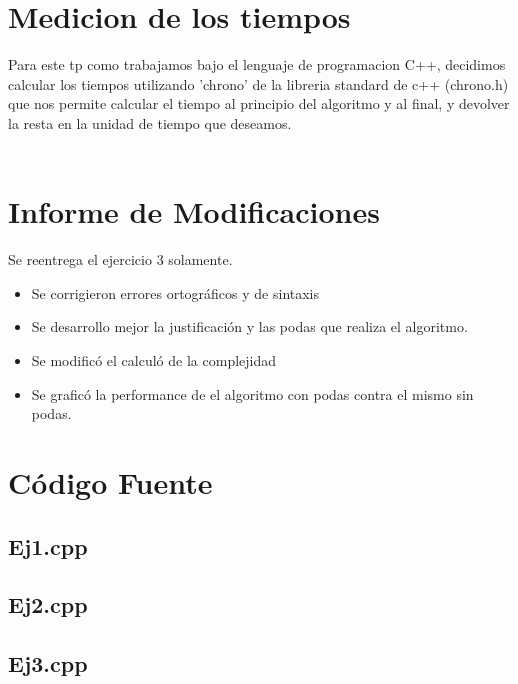 \section{Medicion de los tiempos}

Para este tp como trabajamos bajo el lenguaje de programacion C++, decidimos calcular los tiempos utilizando 'chrono' de la libreria standard de c++ (chrono.h) que nos permite calcular el tiempo al principio del algoritmo y al final, y devolver la resta en la unidad de tiempo que deseamos.\\ \\


\section{Informe de Modificaciones}
Se reentrega el ejercicio 3 solamente.
\begin{itemize}
\item Se corrigieron errores ortogr\'aficos y de sintaxis
\item Se desarrollo mejor la justificaci\'on y las podas que realiza el algoritmo.
\item Se modific\'o el calcul\'o de la complejidad
\item Se grafic\'o la performance de el algoritmo con podas contra el mismo sin podas.
\end{itemize}

\newpage
\section{Código Fuente}
\subsection{Ej1.cpp}


\newpage
\subsection{Ej2.cpp}


\newpage
\subsection{Ej3.cpp}


